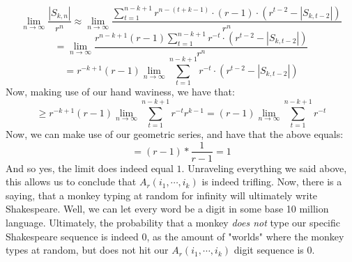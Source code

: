 \documentclass[12pt,a4paper]{article}
\newcommand{\1}[1]{\mathbbm{1}\left\{ #1 \right\}}
\begin{document}
\begin{enumerate}
	$$
		\lim_{n \to \infty} \frac{|S_{k,n}|}{r^n} \approx 
		\lim_{n \to \infty} \frac{\sum_{t=1}^{n - k + 1} r^{n - (t + k - 1)} \cdot (r - 1) \cdot (r^{t - 2} - |S_{k,t-2}|)}{r^n}
	$$
	$$
		=
		\lim_{n \to \infty} \frac{r^{n - k + 1}(r-1)\sum_{t=1}^{n - k + 1} r^{-t} \cdot (r^{t - 2} - |S_{k,t-2}|)}{r^n}
	$$
	$$
		= r^{-k + 1} (r-1) \lim_{n \to \infty} \sum_{t=1}^{n - k + 1} r^{-t} \cdot (r^{t - 2} - |S_{k,t-2}|)
	$$
	Now, making use of our hand waviness, we have that:
	$$
		\geq r^{-k + 1} (r-1) \lim_{n \to \infty} \sum_{t=1}^{n - k + 1} r^{-t} r^{k-1} =
		(r-1) \lim_{n \to \infty} \sum_{t=1}^{n - k + 1} r^{-t}
	$$
	Now, we can make use of our geometric series, and have that the above equals:
	$$
		= (r-1) * \frac{1}{r-1} = 1
	$$
	And so yes, the limit does indeed equal $1$. Unraveling everything we said above, this allows us to conclude that $A_r(i_1, \cdots, i_k)$ is indeed trifling. Now, there is a saying, that a monkey typing at random for infinity will ultimately write Shakespeare. Well, we can let every word be a digit in some base 10 million language. Ultimately, the probability that a monkey \textit{does not} type our specific Shakespeare sequence is indeed $0$, as the amount of "worlds" where the monkey types at random, but does not hit our $A_r(i_1, \cdots, i_k)$ digit sequence is 0.
	
\end{enumerate}
\end{document}

